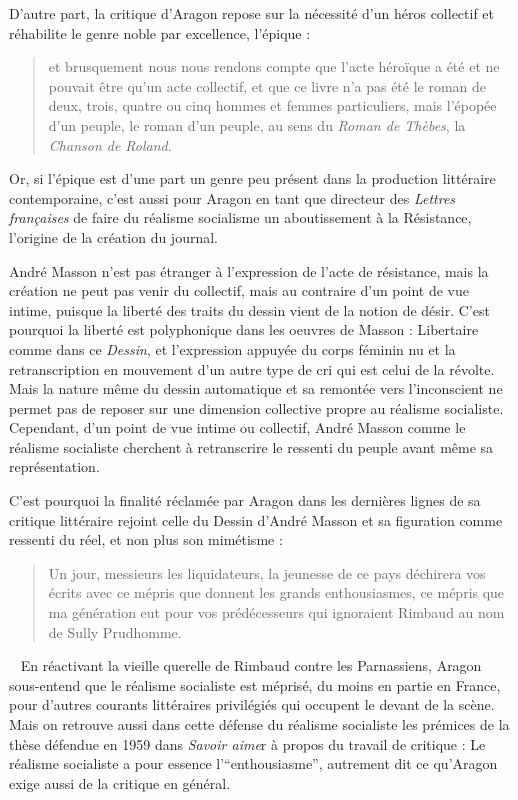 

	D’autre part, la critique d’Aragon repose sur la nécessité d’un héros collectif et réhabilite le genre noble par excellence, l’épique : 
	\begin{quote}
	et brusquement nous nous rendons compte que l’acte héroïque a été et ne pouvait être qu’un acte collectif, et que ce livre n’a pas été le roman de deux, trois, quatre ou cinq hommes et femmes particuliers, mais l’épopée d’un peuple, le roman d’un peuple, au sens du \emph{Roman de Thèbes}, la \emph{Chanson de Roland}.	
	\end{quote}
	
	
	 Or, si l’épique est d’une part un genre peu présent dans la production littéraire contemporaine, c’est aussi pour Aragon en tant que directeur des \emph{Lettres françaises} de faire du réalisme socialisme un aboutissement à la Résistance, l’origine de la création du journal. 

	André Masson n’est pas étranger à l’expression de l’acte de résistance, mais la création ne peut pas venir du collectif, mais au contraire d’un point de vue intime, puisque la liberté des traits du dessin vient de la notion de désir. C’est pourquoi la liberté est polyphonique dans les oeuvres de Masson : Libertaire comme dans ce \emph{Dessin}, et l’expression appuyée du corps féminin nu et la retranscription en mouvement d’un autre type de cri qui est celui de la révolte. Mais la nature même du dessin automatique et sa remontée vers l’inconscient ne permet pas de reposer sur une dimension collective propre au réalisme socialiste. Cependant, d’un point de vue intime ou collectif, André Masson comme le réalisme socialiste cherchent à retranscrire le ressenti du peuple avant même sa représentation. 

	C’est pourquoi la finalité réclamée par Aragon dans les dernières lignes de sa critique littéraire rejoint celle du Dessin d’André Masson et sa figuration comme ressenti du réel, et non plus son mimétisme : 

\begin{quote}
Un jour, messieurs les liquidateurs, la jeunesse de ce pays déchirera vos écrits avec ce mépris que donnent les grands enthousiasmes, ce mépris que ma génération eut pour vos prédécesseurs qui ignoraient Rimbaud au nom de Sully Prudhomme. 	
\end{quote}
 
	 En réactivant la vieille querelle de Rimbaud contre les Parnassiens, Aragon sous-entend que le réalisme socialiste est méprisé, du moins en partie en France, pour d’autres courants littéraires privilégiés qui occupent le devant de la scène. Mais on retrouve aussi dans cette défense du réalisme socialiste les prémices de la thèse défendue en 1959 dans \emph{Savoir aime}r à propos du travail de critique : Le réalisme socialiste a pour essence l’\enquote{enthousiasme}, autrement dit ce qu’Aragon exige aussi de la critique en général.  


